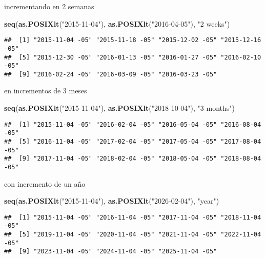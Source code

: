 \documentclass[]{article}
\newenvironment{Shaded}{\begin{snugshade}}{\end{snugshade}}
\newcommand{\KeywordTok}[1]{\textcolor[rgb]{0.13,0.29,0.53}{\textbf{#1}}}
\newcommand{\StringTok}[1]{\textcolor[rgb]{0.31,0.60,0.02}{#1}}
\newcommand{\NormalTok}[1]{#1}
\begin{document}
incrementando en 2 semanas

\begin{Shaded}
\begin{Highlighting}[]
\KeywordTok{seq}\NormalTok{(}\KeywordTok{as.POSIXlt}\NormalTok{(}\StringTok{"2015-11-04"}\NormalTok{), }\KeywordTok{as.POSIXlt}\NormalTok{(}\StringTok{"2016-04-05"}\NormalTok{), }\StringTok{"2 weeks"}\NormalTok{)}
\end{Highlighting}
\end{Shaded}

\begin{verbatim}
##  [1] "2015-11-04 -05" "2015-11-18 -05" "2015-12-02 -05" "2015-12-16 -05"
##  [5] "2015-12-30 -05" "2016-01-13 -05" "2016-01-27 -05" "2016-02-10 -05"
##  [9] "2016-02-24 -05" "2016-03-09 -05" "2016-03-23 -05"
\end{verbatim}

en incrementos de 3 meses

\begin{Shaded}
\begin{Highlighting}[]
\KeywordTok{seq}\NormalTok{(}\KeywordTok{as.POSIXlt}\NormalTok{(}\StringTok{"2015-11-04"}\NormalTok{), }\KeywordTok{as.POSIXlt}\NormalTok{(}\StringTok{"2018-10-04"}\NormalTok{), }\StringTok{"3 months"}\NormalTok{)}
\end{Highlighting}
\end{Shaded}

\begin{verbatim}
##  [1] "2015-11-04 -05" "2016-02-04 -05" "2016-05-04 -05" "2016-08-04 -05"
##  [5] "2016-11-04 -05" "2017-02-04 -05" "2017-05-04 -05" "2017-08-04 -05"
##  [9] "2017-11-04 -05" "2018-02-04 -05" "2018-05-04 -05" "2018-08-04 -05"
\end{verbatim}

con incremento de un año

\begin{Shaded}
\begin{Highlighting}[]
\KeywordTok{seq}\NormalTok{(}\KeywordTok{as.POSIXlt}\NormalTok{(}\StringTok{"2015-11-04"}\NormalTok{), }\KeywordTok{as.POSIXlt}\NormalTok{(}\StringTok{"2026-02-04"}\NormalTok{), }\StringTok{"year"}\NormalTok{)}
\end{Highlighting}
\end{Shaded}

\begin{verbatim}
##  [1] "2015-11-04 -05" "2016-11-04 -05" "2017-11-04 -05" "2018-11-04 -05"
##  [5] "2019-11-04 -05" "2020-11-04 -05" "2021-11-04 -05" "2022-11-04 -05"
##  [9] "2023-11-04 -05" "2024-11-04 -05" "2025-11-04 -05"
\end{verbatim}
\end{document}
